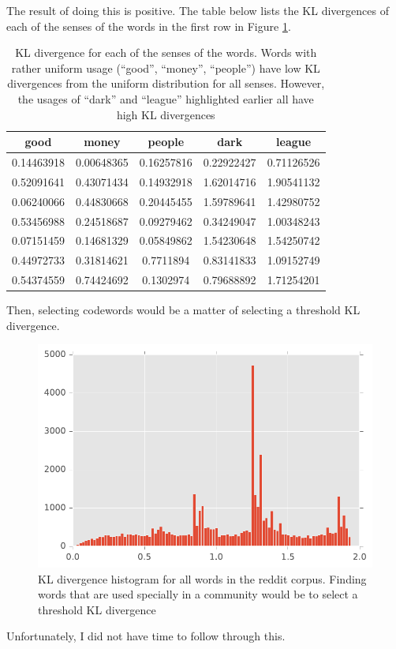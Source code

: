 The result of doing this is positive. The table below lists the KL divergences of each of the senses of the words in the first row in Figure \ref{fig-reddit-kl}.

\begin{table}[H]
\centering
\begin{tabular}{c c c c c}
\toprule
 good & money & people & dark & league \\
\midrule
0.14463918 & 0.00648365 & 0.16257816 & 0.22922427 & 0.71126526 \\
0.52091641 & 0.43071434 & 0.14932918 & 1.62014716 & 1.90541132 \\
0.06240066 & 0.44830668 & 0.20445455 & 1.59789641 & 1.42980752 \\
0.53456988 & 0.24518687 & 0.09279462 & 0.34249047 & 1.00348243 \\
0.07151459 & 0.14681329 & 0.05849862 & 1.54230648 & 1.54250742 \\
0.44972733 & 0.31814621 & 0.7711894 & 0.83141833 & 1.09152749 \\
0.54374559 & 0.74424692 & 0.1302974 & 0.79688892 & 1.71254201 \\
\bottomrule
\end{tabular}
\caption{KL divergence for each of the senses of the words. Words with rather uniform usage (``good'', ``money'', ``people'') have low KL divergences from the uniform distribution for all senses. However, the usages of ``dark'' and ``league'' highlighted earlier all have high KL divergences}
\label{fig-reddit-kl}
\end{table}

Then, selecting codewords would be a matter of selecting a threshold KL divergence.

\begin{figure}[h]
\centering
\includegraphics[width=.5\textwidth]{figures/reddit-community-histo.pdf}
\caption{KL divergence histogram for all words in the reddit corpus. Finding words that are used specially in a community would be to select a threshold KL divergence}
\label{fig-wsj-count}
\end{figure}

Unfortunately, I did not have time to follow through this.
